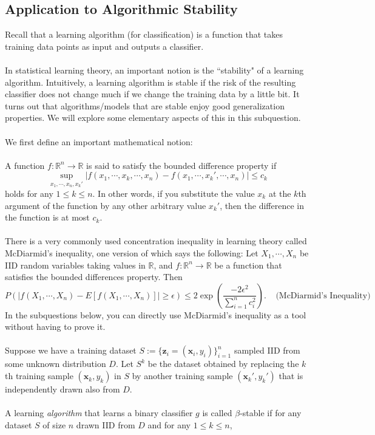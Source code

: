 \documentclass{exam}
\newcommand{\xv}{\boldsymbol{x}}
\newcommand{\zv}{\boldsymbol{z}}
\begin{document}
\subsection{Application to Algorithmic Stability}
Recall that a learning algorithm (for classification) is a function that takes training data points as input and outputs a classifier. \\\\
In statistical learning theory, an important notion is the ``stability" of a learning algorithm. Intuitively, a learning algorithm is stable if the risk of the resulting classifier does not change much if we change the training data by a little bit. It turns out that algorithms/models that are stable enjoy good generalization properties. We will explore some elementary aspects of this in this subquestion. 
\\\\
We first define an important mathematical notion: 
\\\\
A function $f: \mathbb{R}^n \to \mathbb{R}$ is said to satisfy the bounded difference property if 
$$ \sup_{x_1, \cdots, x_n, x_k'} |f(x_1, \cdots, x_k, \cdots, x_n) - f(x_1, \cdots,x_k', \cdots, x_n)| \leq c_k$$
holds for any $1 \leq k \leq n$. In other words, if you substitute the value $x_k$ at the $k$th argument of the function by any other arbitrary value $x_k'$, then the difference in the function is at most $c_k$. 
\\\\
There is a very commonly used concentration inequality in learning theory called McDiarmid's inequality, one version of which says the following:
Let $X_1, \cdots, X_n$ be IID random variables taking values in $\mathbb{R}$, and $f: \mathbb{R}^n \to \mathbb{R}$ be a function that satisfies the bounded differences property. Then
$$P\left(\left|f(X_1, \cdots, X_n) - E[f(X_1, \cdots, X_n)] \right| \geq \epsilon \right) \leq 2\exp\left(\frac{-2\epsilon^2}{\sum_{i = 1}^n c_i^2}
\right).\;\;\;\; \textrm{(McDiarmid's Inequality)}$$
In the subquestions below, you can directly use McDiarmid's inequality as a tool without having to prove it. 
\\\\Suppose we have a training dataset $S := \{\zv_i = (\xv_i,y_i)\}_{i=1}^n$ sampled IID from some unknown distribution $D$. Let $S^k$ be the dataset obtained by replacing the $k$th training sample $(\xv_k,y_k)$ in $S$ by another training sample $(\xv_k',y_k')$ that is independently drawn also from $D$. 
\\\\ A learning \textit{algorithm} that learns a binary classifier $g$ is called $\beta$-stable if for any dataset $S$ of size $n$ drawn IID from $D$ and for any $1 \leq k \leq n$, 
\end{document}

